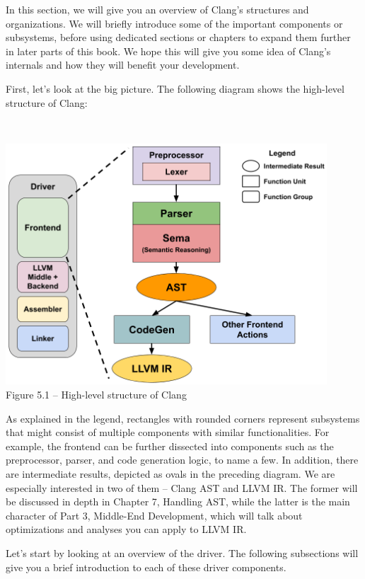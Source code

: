 
In this section, we will give you an overview of Clang's structures and organizations. We will briefly introduce some of the important components or subsystems, before using dedicated sections or chapters to expand them further in later parts of this book. We hope this will give you some idea of Clang's internals and how they will benefit your development.

First, let's look at the big picture. The following diagram shows the high-level structure of Clang:

\hspace*{\fill} \\ %
\begin{center}
\includegraphics[width=0.9\textwidth]{content/2/chapter5/images/1.png}\\
Figure 5.1 – High-level structure of Clang
\end{center}

As explained in the legend, rectangles with rounded corners represent subsystems that might consist of multiple components with similar functionalities. For example, the frontend can be further dissected into components such as the preprocessor, parser, and code generation logic, to name a few. In addition, there are intermediate results, depicted as ovals in the preceding diagram. We are especially interested in two of them – Clang AST and LLVM IR. The former will be discussed in depth in Chapter 7, Handling AST, while the latter is the main character of Part 3, Middle-End Development, which will talk about optimizations and analyses you can apply to LLVM IR.

Let's start by looking at an overview of the driver. The following subsections will give you a brief introduction to each of these driver components.


